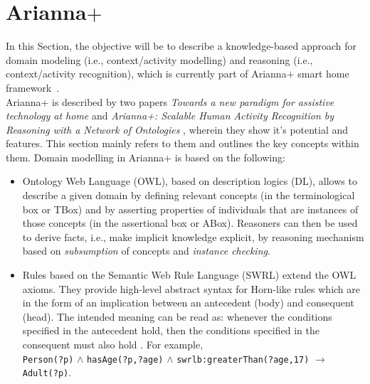 \documentclass{thesisreport}
\begin{document}
 \section{Arianna\texorpdfstring{$+$}{+}} \label{Arianna}    
 In this Section, the objective will be to describe a knowledge-based approach for domain modeling (i.e., context/activity modelling) and reasoning (i.e., context/activity recognition), which is currently part of Arianna$+$ smart home framework~\cite{kareem2018arianna}. \\
 Arianna+ is described by two papers \textit{Towards a new paradigm for assistive technology at home} \cite{buoncompagni2017towards} and \textit{Arianna+: Scalable Human Activity Recognition by Reasoning with a Network of Ontologies} \cite{kareem2018arianna}, wherein they show it's potential and features. This section mainly refers to them and outlines the key concepts within them. Domain modelling in Arianna+ is based on the following:
 \begin{itemize}
     \item Ontology Web Language (OWL), based on description logics (DL), allows to describe a given domain by defining relevant concepts (in the terminological box or TBox) and by asserting properties of individuals that are instances of those concepts (in the assertional box or ABox).
     Reasoners can then be used to derive facts, i.e., make implicit knowledge explicit, by reasoning mechanism \cite{donini1994deduction} based on \textit{subsumption} of concepts and \textit{instance checking}.
     \item Rules based on the Semantic Web Rule Language (SWRL) extend the OWL axioms. They provide high-level abstract syntax for Horn-like rules which are in the form of an implication between an antecedent (body) and consequent (head). The intended meaning can be read as: whenever the conditions specified in the antecedent hold, then the conditions specified in the consequent must also hold \cite{horrocks2004swrl}. For example, \\
     \texttt{Person(?p)} $\wedge$ \texttt{hasAge(?p,?age)} $\wedge$ \texttt{swrlb:greaterThan(?age,17)} $\rightarrow$ \texttt{Adult(?p)}.
 \end{itemize}
 
\end{document}
